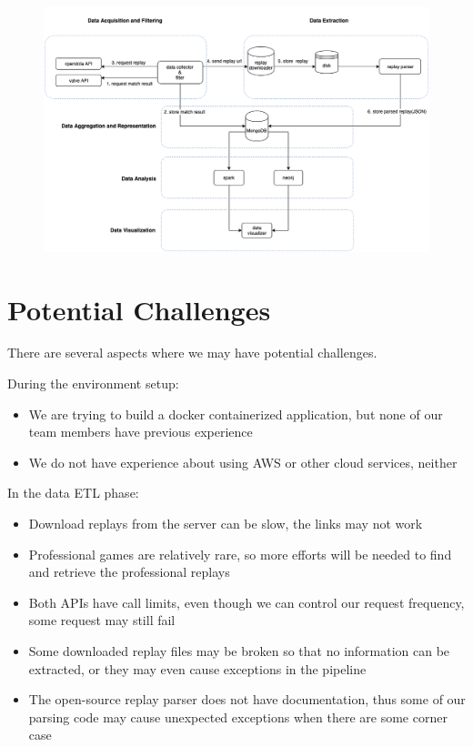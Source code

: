 \documentclass{article}
\begin{document}
\begin{figure}[H]
	\centering
	\includegraphics[width=\linewidth]{pic/arc.png}
\end{figure}

\section{Potential Challenges}

There are several aspects where we may have potential challenges.

During the environment setup:

\begin{itemize}
	\item We are trying to build a docker containerized application, but none of our team members have previous experience
	\item We do not have experience about using AWS or other cloud services, neither
\end{itemize}

In the data ETL phase:

\begin{itemize}
	\item Download replays from the server can be slow, the links may not work
	\item Professional games are relatively rare, so more efforts will be needed to find and retrieve the professional replays
	\item Both APIs have call limits, even though we can control our request frequency, some request may still fail
	\item Some downloaded replay files may be broken so that no information can be extracted, or they may even cause exceptions in the pipeline
	\item The open-source replay parser does not have documentation, thus some of our parsing code may cause unexpected exceptions when there are some corner case
\end{itemize}
\end{document}
